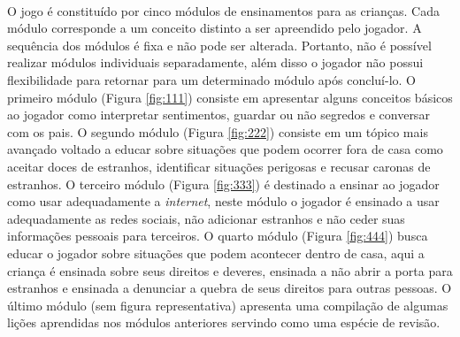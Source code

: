 \begin{figure}
  \\
  \vspace{-2pt}
  \vspace{-2pt}
\end{figure}

O jogo é constituído por cinco módulos de ensinamentos para as crianças. Cada módulo corresponde a um conceito distinto a ser apreendido pelo jogador. A sequência dos módulos é fixa e não pode ser alterada. Portanto, não é possível realizar módulos individuais separadamente, além disso o jogador não possui flexibilidade para retornar para um determinado módulo após concluí-lo. O primeiro módulo (Figura \ref{fig:111}) consiste em apresentar alguns conceitos básicos ao jogador como interpretar sentimentos, guardar ou não segredos e conversar com os pais. O segundo módulo (Figura \ref{fig:222}) consiste em um tópico mais avançado voltado a educar sobre situações que podem ocorrer fora de casa como aceitar doces de estranhos, identificar situações perigosas e recusar caronas de estranhos. O terceiro módulo (Figura \ref{fig:333}) é destinado a ensinar ao jogador como usar adequadamente a \textit{internet}, neste módulo o jogador é ensinado a usar adequadamente as redes sociais, não adicionar estranhos e não ceder suas informações pessoais para terceiros. O quarto módulo (Figura \ref{fig:444}) busca educar o jogador sobre situações que podem acontecer dentro de casa, aqui a criança é ensinada sobre seus direitos e deveres, ensinada a não abrir a porta para estranhos e ensinada a denunciar a quebra de seus direitos para outras pessoas. O último módulo (sem figura representativa) apresenta uma compilação de algumas lições aprendidas nos módulos anteriores servindo como uma espécie de revisão. 

